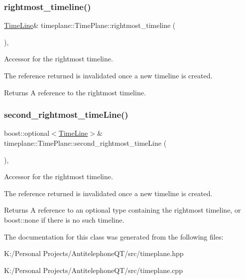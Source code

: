 \subsubsection{\texorpdfstring{rightmost\+\_\+timeline()}{rightmost\_timeline()}}
{\footnotesize\ttfamily \hyperlink{classtimeplane_1_1_time_line}{Time\+Line}\& timeplane\+::\+Time\+Plane\+::rightmost\+\_\+timeline (\begin{DoxyParamCaption}{ }\end{DoxyParamCaption})\hspace{0.3cm}{\ttfamily [inline]}, {\ttfamily [noexcept]}}



Accessor for the rightmost timeline. 

The reference returned is invalidated once a new timeline is created. \begin{DoxyReturn}{Returns}
A reference to the rightmost timeline. 
\end{DoxyReturn}
\mbox{\label{classtimeplane_1_1_time_plane_a32da05c87dfe4bc33ec5cb87fd97297f}} 
\subsubsection{\texorpdfstring{second\+\_\+rightmost\+\_\+time\+Line()}{second\_rightmost\_timeLine()}}
{\footnotesize\ttfamily boost\+::optional$<$\hyperlink{classtimeplane_1_1_time_line}{Time\+Line}$>$\& timeplane\+::\+Time\+Plane\+::second\+\_\+rightmost\+\_\+time\+Line (\begin{DoxyParamCaption}{ }\end{DoxyParamCaption})\hspace{0.3cm}{\ttfamily [inline]}, {\ttfamily [noexcept]}}



Accessor for the rightmost timeline. 

The reference returned is invalidated once a new timeline is created. \begin{DoxyReturn}{Returns}
A reference to an optional type containing the rightmost timeline, or {\ttfamily boost\+::none} if there is no such timeline. 
\end{DoxyReturn}


The documentation for this class was generated from the following files\+:\begin{DoxyCompactItemize}
\item 
K\+:/\+Personal Projects/\+Antitelephone\+Q\+T/src/timeplane.\+hpp\item 
K\+:/\+Personal Projects/\+Antitelephone\+Q\+T/src/timeplane.\+cpp\end{DoxyCompactItemize}
